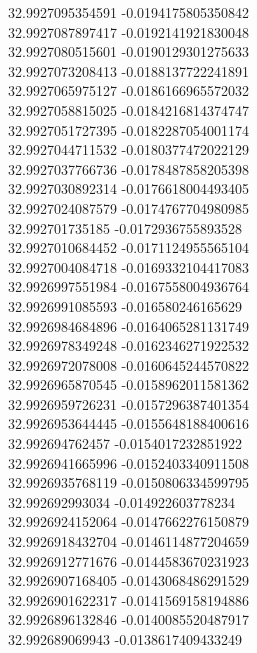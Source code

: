 {32.9927095354591	-0.0194175805350842\\
32.9927087897417	-0.0192141921830048\\
32.9927080515601	-0.0190129301275633\\
32.9927073208413	-0.0188137722241891\\
32.9927065975127	-0.0186166965572032\\
32.9927058815025	-0.0184216814374747\\
32.9927051727395	-0.0182287054001174\\
32.9927044711532	-0.0180377472022129\\
32.9927037766736	-0.0178487858205398\\
32.9927030892314	-0.0176618004493405\\
32.9927024087579	-0.0174767704980985\\
32.992701735185	-0.0172936755893528\\
32.9927010684452	-0.0171124955565104\\
32.9927004084718	-0.0169332104417083\\
32.9926997551984	-0.0167558004936764\\
32.9926991085593	-0.016580246165629\\
32.9926984684896	-0.0164065281131749\\
32.9926978349248	-0.0162346271922532\\
32.9926972078008	-0.0160645244570822\\
32.9926965870545	-0.0158962011581362\\
32.9926959726231	-0.0157296387401354\\
32.9926953644445	-0.0155648188400616\\
32.992694762457	-0.0154017232851922\\
32.9926941665996	-0.0152403340911508\\
32.9926935768119	-0.0150806334599795\\
32.992692993034	-0.014922603778234\\
32.9926924152064	-0.0147662276150879\\
32.9926918432704	-0.0146114877204659\\
32.9926912771676	-0.0144583670231923\\
32.9926907168405	-0.0143068486291529\\
32.9926901622317	-0.0141569158194886\\
32.9926896132846	-0.0140085520487917\\
32.992689069943	-0.0138617409433249\\
}
